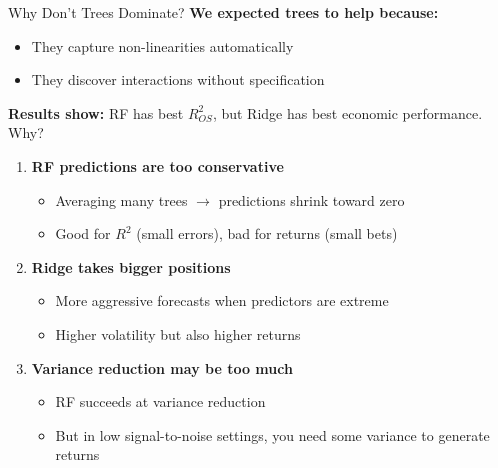 \documentclass[10pt]{beamer}
\begin{document}
\begin{frame}{Why Don't Trees Dominate?}
  \textbf{We expected trees to help because:}
  \begin{itemize}
    \item They capture non-linearities automatically
    \item They discover interactions without specification
  \end{itemize}

  \vspace{0.5em}
  \textbf{Results show:} RF has best $R^2_{OS}$, but Ridge has best economic performance. Why?

  \vspace{0.5em}
  \begin{enumerate}
    \item \textbf{RF predictions are too conservative}
    \begin{itemize}
      \item Averaging many trees $\to$ predictions shrink toward zero
      \item Good for $R^2$ (small errors), bad for returns (small bets)
    \end{itemize}

    \vspace{0.3em}
    \item \textbf{Ridge takes bigger positions}
    \begin{itemize}
      \item More aggressive forecasts when predictors are extreme
      \item Higher volatility but also higher returns
    \end{itemize}

    \vspace{0.3em}
    \item \textbf{Variance reduction may be too much}
    \begin{itemize}
      \item RF succeeds at variance reduction
      \item But in low signal-to-noise settings, you need some variance to generate returns
    \end{itemize}
  \end{enumerate}
\end{frame}

\end{document}
